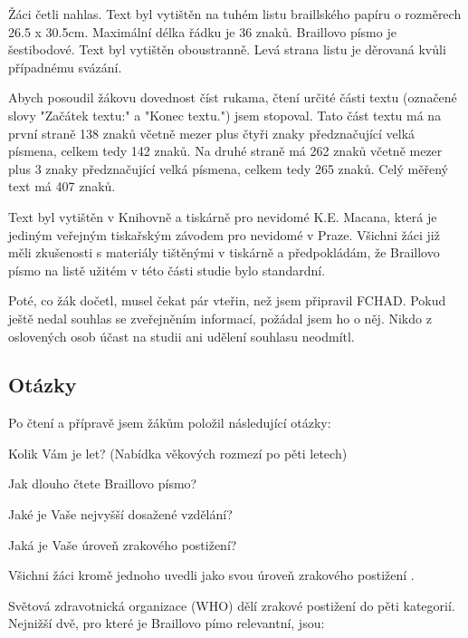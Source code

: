 Žáci četli nahlas. Text byl vytištěn na tuhém listu braillského papíru o rozměrech 26.5 x 30.5cm.  Maximální délka řádku je 36 znaků.  Braillovo písmo je šestibodové.  Text byl vytištěn oboustranně. Levá strana listu je děrovaná kvůli případnému svázání.

Abych posoudil žákovu dovednost číst rukama, čtení určité části textu (označené slovy "Začátek textu:" a "Konec textu.") jsem stopoval. Tato část textu má na první straně 138 znaků včetně mezer plus čtyři znaky předznačující velká písmena, celkem tedy 142 znaků. Na druhé straně má 262 znaků včetně mezer plus 3 znaky předznačující velká písmena, celkem tedy 265 znaků. Celý měřený text má 407 znaků.

Text byl vytištěn v Knihovně a tiskárně pro nevidomé K.E. Macana, která je jediným veřejným tiskařským závodem pro nevidomé v Praze.  Všichni žáci již měli zkušenosti s materiály tištěnými v tiskárně a předpokládám, že Braillovo písmo na listě užitém v této části studie bylo standardní.

Poté, co žák dočetl, musel čekat pár vteřin, než jsem připravil FCHAD. Pokud ještě nedal souhlas se zveřejněním informací, požádal jsem ho o něj.  Nikdo z oslovených osob účast na studii ani udělení souhlasu neodmítl.

\subsection{Otázky}

Po čtení a přípravě jsem žákům položil následující otázky:

Kolik Vám je let? (Nabídka věkových rozmezí po pěti letech)

Jak dlouho čtete Braillovo písmo?

Jaké je Vaše nejvyšší dosažené vzdělání?

Jaká je Vaše úroveň zrakového postižení?

Všichni žáci kromě jednoho uvedli jako svou úroveň zrakového postižení .

Světová zdravotnická organizace (WHO) dělí zrakové postižení do pěti kategorií. Nejnižší dvě, pro které je Braillovo pímo relevantní, jsou:

  \citep{sonsklasifikace}

